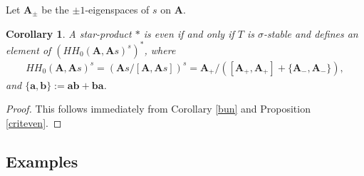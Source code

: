 \documentclass[pdftex]{sigma}
\numberwithin{equation}{section}
\newtheorem{Corollary}[Theorem]{Corollary}
\begin{document}
Let ${{\mathbf A}}_\pm$ be the $\pm 1$-eigenspaces of $s$ on ${{\mathbf A}}$.

\begin{Corollary}\label{criteven1} A star-product $*$ is even if and only if $T$ is $\sigma$-stable
and defines an element of $(HH_0({{\mathbf A}},{{\mathbf A}}s)^s)^*$, where
 \begin{gather*}
 HH_0({{\mathbf A}},{{\mathbf A}}s)^s=({{\mathbf A}}s/[{{\mathbf A}},{{\mathbf A}}s])^s=
 {{\mathbf A}}_+/([{{\mathbf A}}_+,{{\mathbf A}}_+]+\lbrace{{{\mathbf A}}_-,{{\mathbf A}}_-\rbrace}),
 \end{gather*}
 and $\lbrace{{\mathbf a},{\mathbf b}\rbrace}:={\mathbf{ab}}+{\mathbf{ba}}$.
\end{Corollary}

\begin{proof} This follows immediately from Corollary \ref{bun} and Proposition \ref{criteven}.
\end{proof}

\subsection{Examples}
\end{document}
